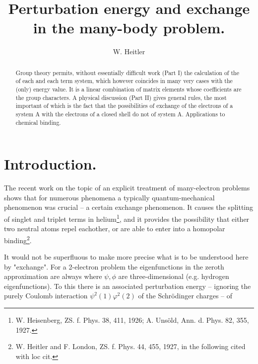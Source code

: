 \begin{paper}{1}
\begin{header}
\title{Perturbation energy and exchange in the many-body problem.}
\author{W. Heitler}
\makeheader
\end{header}

\newcommand{\Aikp}[3]{\left({#1}_{#2}^{#3 \vphantom{P_{n!}}}\right)}

\begin{abstract}
Group theory permits, without essentially difficult work (Part I) the calculation of the  of each  and each term system, which however coincides in many very cases with the (only) energy value. It is a linear combination of matrix elements whose coefficients are the group characters. A physical discussion (Part II) gives general rules, the most important of which is the fact that the possibilities of exchange of the electrons of a system A with the electrons of a closed shell do not  of system A. Applications to chemical binding.
\end{abstract}

\section*{Introduction.}

The recent work on the topic of an explicit treatment of many-electron problems shows that for numerous phenomena a typically quantum-mechanical phenomenon was crucial -- a certain exchange phenomenon. It causes the splitting of singlet and triplet terms in helium\footnote{W. Heisenberg, ZS. f. Phys. 38, 411, 1926; A. Uns\"old, Ann. d. Phys. 82, 355, 1927.}, and it provides the possibility that either two neutral atoms repel eachother, or are able to enter into a homopolar binding\footnote{W. Heitler and F. London, ZS. f. Phys. 44, 455, 1927, in the following cited with loc cit.}.

It would not be superfluous to make more precise what is to be understood here by "exchange". For a 2-electron problem the eigenfunctions in the zeroth approximation are always
where $\psi,\phi$ are three-dimensional  (e.g. hydrogen eigenfunctions). To this there is an associated perturbation energy -- ignoring the purely Coulomb interaction $\psi^2(1)\varphi^2(2)$ of the Schr\"odinger charges -- of


\end{paper}
